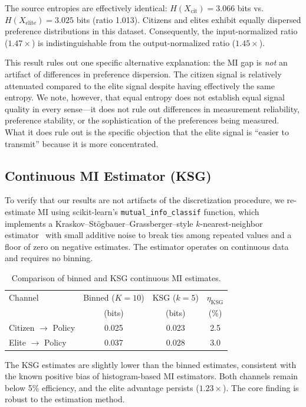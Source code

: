 \documentclass[twocolumn,10pt]{article}
\begin{document}
The source entropies are effectively identical: $H(X_\text{cit}) = 3.066$ bits vs.\ $H(X_\text{elite}) = 3.025$ bits (ratio 1.013).  Citizens and elites exhibit equally dispersed preference distributions in this dataset.  Consequently, the input-normalized ratio ($1.47\times$) is indistinguishable from the output-normalized ratio ($1.45\times$).

This result rules out one specific alternative explanation: the MI gap is \emph{not} an artifact of differences in preference dispersion.  The citizen signal is relatively attenuated compared to the elite signal despite having effectively the same entropy.  We note, however, that equal entropy does not establish equal signal quality in every sense---it does not rule out differences in measurement reliability, preference stability, or the sophistication of the preferences being measured.  What it does rule out is the specific objection that the elite signal is ``easier to transmit'' because it is more concentrated.

\subsection{Continuous MI Estimator (KSG)}

To verify that our results are not artifacts of the discretization procedure, we re-estimate MI using scikit-learn's \texttt{mutual\_info\_classif} function, which implements a Kraskov--St\"{o}gbauer--Grassberger--style $k$-nearest-neighbor estimator~\citep{kraskov2004} with small additive noise to break ties among repeated values and a floor of zero on negative estimates.  The estimator operates on continuous data and requires no binning.

\begin{table}[t]
\centering
\caption{Comparison of binned and KSG continuous MI estimates.}
\label{tab:ksg}
\begin{tabular}{@{}lccc@{}}
\toprule
Channel & Binned ($K{=}10$) & KSG ($k{=}5$) & $\eta_\text{KSG}$ \\
 & (bits) & (bits) & (\%) \\
\midrule
Citizen $\to$ Policy & 0.025 & 0.023 & 2.5 \\
Elite $\to$ Policy & 0.037 & 0.028 & 3.0 \\
\bottomrule
\end{tabular}
\end{table}

The KSG estimates are slightly lower than the binned estimates, consistent with the known positive bias of histogram-based MI estimators.  Both channels remain below 5\% efficiency, and the elite advantage persists ($1.23\times$).  The core finding is robust to the estimation method.
\end{document}
